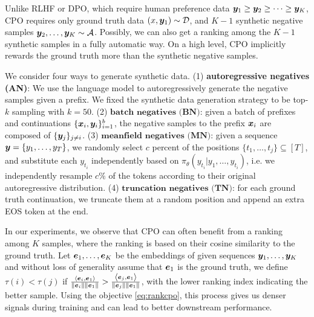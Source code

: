 Unlike RLHF or DPO, which require human preference data ${\bm{y}}_1\geq {\bm{y}}_2\geq\cdots\geq{\bm{y}}_K$, CPO requires only ground truth data $(x, {\bm{y}}_1)\sim \mathcal{D}$, and $K-1$ synthetic negative samples ${\bm{y}}_2,\ldots,{\bm{y}}_K\sim\mathcal{A}$. Possibly, we can also get a ranking among the $K-1$ synthetic samples in a fully automatic way. On a high level, CPO implicitly rewards the ground truth more than the synthetic negative samples.

We consider four ways to generate synthetic data. (1) \textbf{autoregressive negatives (AN)}: We use the language model to autoregressively generate the negative samples given a prefix. We fixed the synthetic data generation strategy to be top-$k$ sampling with $k=50$. (2) $\textbf{batch negatives (BN)}$: given a batch of prefixes and continuations $\{{\bm{x}}_i, {\bm{y}}_i\}_{i=1}^b$, the negative samples to the prefix ${\bm{x}}_i$ are composed of $\{{\bm{y}}_j\}_{j\neq i}$. (3) $\textbf{meanfield negatives (MN)}$: given a sequence ${\bm{y}} = \{y_1,\ldots, y_T\}$, we randomly select $c$ percent of the positions $\{t_1,\ldots, t_j\}\subseteq [T]$, and substitute each $y_{t_i}$ independently based on $\pi_\theta(y_{t_i}|y_1,\ldots,y_{t_i})$, i.e. we independently resample $c\%$ of the tokens according to their original autoregressive distribution. (4) $\textbf{truncation negatives (TN})$: for each ground truth continuation, we truncate them at a random position and append an extra EOS token at the end.


In our experiments, we observe that CPO can often benefit from a ranking among $K$ samples, where the ranking is based on their cosine similarity to the ground truth. Let ${\bm{e}}_1,\ldots, {\bm{e}}_K$ be the embeddings of given sequences ${\bm{y}}_1,\ldots, {\bm{y}}_K$ and without loss of generality assume that ${\bm{e}}_1$ is the ground truth, we define $\tau(i)<\tau(j)$ if $\frac{\left\langle {\bm{e}}_i, {\bm{e}}_1 \right \rangle}{\|{\bm{e}}_i\|\|{\bm{e}}_1\|}>\frac{\left\langle {\bm{e}}_j, {\bm{e}}_1 \right \rangle}{\|{\bm{e}}_j\|\|{\bm{e}}_1\|}$, with the lower ranking index indicating the better sample. Using the objective \cref{eq:rankcpo}, this process gives us denser signals during training and can lead to better downstream performance.


 